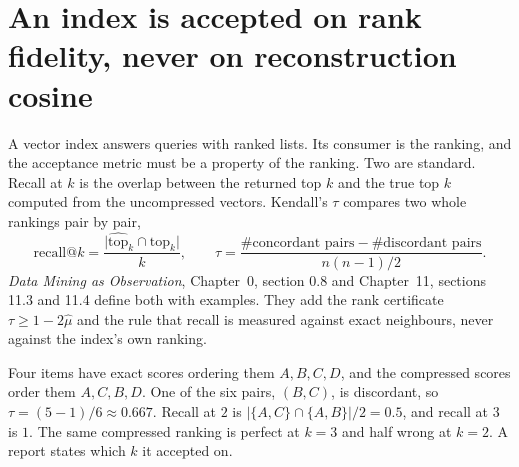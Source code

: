 
\section{An index is accepted on rank fidelity, never on reconstruction cosine}\label{sec:ch07:accept}

A vector index answers queries with ranked lists. Its consumer is the ranking, and the acceptance metric must be a property of the ranking. Two are standard. Recall at $k$ is the overlap between the returned top $k$ and the true top $k$ computed from the uncompressed vectors. Kendall's $\tau$ \cite{kendall1938} compares two whole rankings pair by pair,
\begin{equation}\label{eq:ch07:recall}
\mathrm{recall}@k=\frac{\big|\widehat{\mathrm{top}}_k\cap\mathrm{top}_k\big|}{k},\qquad
\tau=\frac{\#\text{concordant pairs}-\#\text{discordant pairs}}{n(n-1)/2}.
\end{equation}
\emph{Data Mining as Observation}, Chapter~0, section 0.8 and Chapter~11, sections 11.3 and 11.4 define both with examples. They add the rank certificate $\tau\ge1-2\hat\mu$ and the rule that recall is measured against exact neighbours, never against the index's own ranking.

\begin{example}\label{ex:ch07:recall}
Four items have exact scores ordering them $A,B,C,D$, and the compressed scores order them $A,C,B,D$. One of the six pairs, $(B,C)$, is discordant, so $\tau=(5-1)/6\approx0.667$. Recall at $2$ is $|\{A,C\}\cap\{A,B\}|/2=0.5$, and recall at $3$ is $1$. The same compressed ranking is perfect at $k=3$ and half wrong at $k=2$. A report states which $k$ it accepted on.
\end{example}

